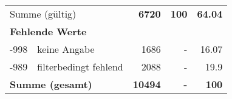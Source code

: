 \begin{longtable}{lXrrr}
     \midrule
     \multicolumn{2}{l}{Summe (gültig)} &
       \textbf{\num{6720}} &
     \textbf{100} &
       \textbf{\num[round-mode=places,round-precision=2]{64,04}} \\
     \multicolumn{5}{l}{\textbf{Fehlende Werte}}\\
       -998 &
       keine Angabe &
         \num{1686} &
        - &
         \num[round-mode=places,round-precision=2]{16,07} \\
       -989 &
       filterbedingt fehlend &
         \num{2088} &
        - &
         \num[round-mode=places,round-precision=2]{19,9} \\
     \midrule
     \multicolumn{2}{l}{\textbf{Summe (gesamt)}} &
          \textbf{\num{10494}} &
        \textbf{-} &
        \textbf{100} \\
     \bottomrule
     \end{longtable}
     
